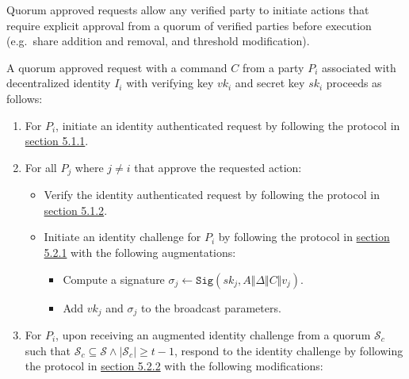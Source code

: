 \documentclass[
]{article}
\providecommand{\tightlist}{%
  \setlength{\itemsep}{0pt}\setlength{\parskip}{0pt}}
\begin{document}
Quorum approved requests allow any verified party to initiate actions
that require explicit approval from a quorum of verified parties before
execution (e.g.~share addition and removal, and threshold modification).

A quorum approved request with a command \(C\) from a party \(P_i\)
associated with decentralized identity \(I_i\) with verifying key
\(vk_i\) and secret key \(sk_i\) proceeds as follows:

\begin{enumerate}
\def\labelenumi{\arabic{enumi}.}
\tightlist
\item
  For \(P_i\), initiate an identity authenticated request by following
  the protocol in
  \protect\hyperlink{identity-authed-request-initiation}{section 5.1.1}.
\item
  For all \(P_j\) where \(j \neq i\) that approve the requested action:

  \begin{itemize}
  \tightlist
  \item
    Verify the identity authenticated request by following the protocol
    in \protect\hyperlink{identity-authed-request-verification}{section
    5.1.2}.
  \item
    Initiate an identity challenge for \(P_i\) by following the protocol
    in \protect\hyperlink{identity-challenge-initiation}{section 5.2.1}
    with the following augmentations:

    \begin{itemize}
    \tightlist
    \item
      Compute a signature
      \(\sigma _j \leftarrow \mathtt{Sig}(sk_j, A \Vert \Delta \Vert C \Vert v_j)\).
    \item
      Add \(vk_j\) and \(\sigma _j\) to the broadcast parameters.
    \end{itemize}
  \end{itemize}
\item
  For \(P_i\), upon receiving an augmented identity challenge from a
  quorum \(\mathcal{S} _c\) such that
  \(\mathcal{S} _c \subseteq \mathcal{S} \land |\mathcal{S} _c| \geq t - 1\),
  respond to the identity challenge by following the protocol in
  \protect\hyperlink{identity-challenge-response}{section 5.2.2} with
  the following modifications:


\end{enumerate}
\end{document}
